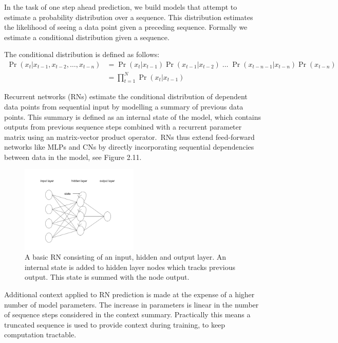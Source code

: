 \noindent In the task of one step ahead prediction, we build models that attempt to estimate a probability distribution over a sequence. This distribution estimates the likelihood of seeing a data point given a preceding sequence. Formally we estimate a conditional distribution given a sequence. \par 

\noindent The conditional distribution is defined as follows:
\begin{equation}
	\begin{split}
		\Pr( x_t | x_{t - 1},  x_{t - 2}, \dots,  x_{t - n} ) & = \Pr(x_t | x_{t - 1}) \Pr(x_{t - 1}| x_{t - 2}) \; \dots \; \Pr(x_{t - n - 1}| x_{t - n}) \Pr(x_{t-n}) \\
		& = \prod_{t=1}^N \Pr(x_t | x_{t - 1})
	\end{split}
\end{equation}

\noindent Recurrent networks (RNs) estimate the conditional distribution of dependent data points from sequential input by modelling a summary of previous data points. This summary is defined as an internal state of the model, which contains outputs from previous sequence steps combined with a recurrent parameter matrix using an matrix-vector product operator.\ RNs thus extend feed-forward networks like MLPs and CNs by directly incorporating sequential dependencies between data in the model, see Figure 2.11. \par

\begin{figure}[H]
   	\centering
    	\includegraphics[width=0.5\textwidth, height=0.3\textwidth]{recurrent_network}
	\caption{A basic RN consisting of an input, hidden and output layer. An internal state is added to hidden layer nodes which tracks previous output. This state is summed with the node output.}
\end{figure}

\noindent Additional context applied to RN prediction is made at the expense of a higher number of model parameters. The increase in parameters is linear in the number of sequence steps considered in the context summary. Practically this means a truncated sequence is used to provide context during training, to keep computation tractable. \par

